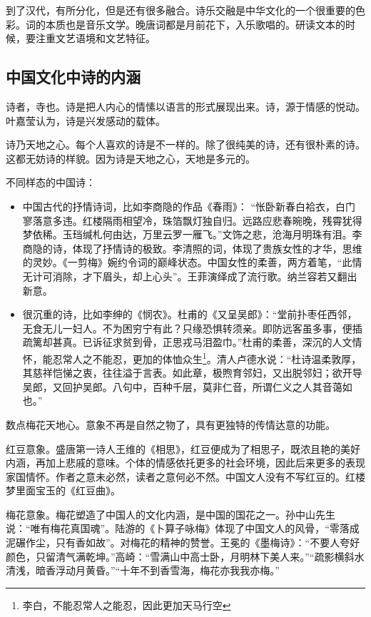 \documentclass[blue,iPad,cn]{elegantnote}
\begin{document}
到了汉代，有所分化，但是还有很多融合。诗乐交融是中华文化的一个很重要的色彩。词的本质也是音乐文学。晚唐词都是月前花下，入乐歌唱的。研读文本的时候，要注重文艺语境和文艺特征。

\subsection{中国文化中诗的内涵}

诗者，寺也。诗是把人内心的情愫以语言的形式展现出来。诗，源于情感的悦动。叶嘉莹认为，诗是兴发感动的载体。

诗乃天地之心。每个人喜欢的诗是不一样的。除了很纯美的诗，还有很朴素的诗。这都无妨诗的样貌。因为诗是天地之心，天地是多元的。

不同样态的中国诗：

\begin{itemize}
	\item 中国古代的抒情诗词，比如李商隐的作品《春雨》：	“怅卧新春白袷衣，白门寥落意多违。红楼隔雨相望冷，珠箔飘灯独自归。远路应悲春晼晚，残霄犹得梦依稀。玉珰缄札何由达，万里云罗一雁飞。”文饰之悲，沧海月明珠有泪。李商隐的诗，体现了抒情诗的极致。李清照的词，体现了贵族女性的才华，思维的灵妙。《一剪梅》婉约令词的巅峰状态。中国女性的柔善，两方着笔，“此情无计可消除，才下眉头，却上心头”。王菲演绎成了流行歌。纳兰容若又翻出新意。
	\item 很沉重的诗，比如李绅的《悯农》。杜甫的《又呈吴郎》：“堂前扑枣任西邻，无食无儿一妇人。不为困穷宁有此？只缘恐惧转须亲。即防远客虽多事，便插疏篱却甚真。已诉征求贫到骨，正思戎马泪盈巾。”杜甫的柔善，深沉的人文情怀，能忍常人之不能忍，更加的体恤众生\footnote{李白，不能忍常人之能忍，因此更加天马行空}。清人卢德水说：“杜诗温柔敦厚，其慈祥恺悌之衷，往往溢于言表。如此章，极煦育邻妇，又出脱邻妇；欲开导吴郎，又回护吴郎。八句中，百种千层，莫非仁音，所谓仁义之人其音蔼如也。”
\end{itemize}

数点梅花天地心。意象不再是自然之物了，具有更独特的传情达意的功能。

\begin{example}
	红豆意象。盛唐第一诗人王维的《相思》，红豆便成为了相思子，既浓且艳的美好内涵，再加上悲戚的意味。个体的情感依托更多的社会环境，因此后来更多的表现家国情怀。作者之意未必然，读者之意何必不然。中国文人没有不写红豆的。红楼梦里面宝玉的《红豆曲》。
\end{example}

\begin{example}
	梅花意象。梅花塑造了中国人的文化内涵，是中国的国花之一。孙中山先生说：“唯有梅花真国魂”。陆游的《卜算子咏梅》体现了中国文人的风骨，“零落成泥碾作尘，只有香如故”。对梅花的精神的赞誉。王冕的《墨梅诗》：“不要人夸好颜色，只留清气满乾坤。”高崎：“雪满山中高士卧，月明林下美人来。”“疏影横斜水清浅，暗香浮动月黄昏。”“十年不到香雪海，梅花亦我我亦梅。”
\end{example}
\end{document}
